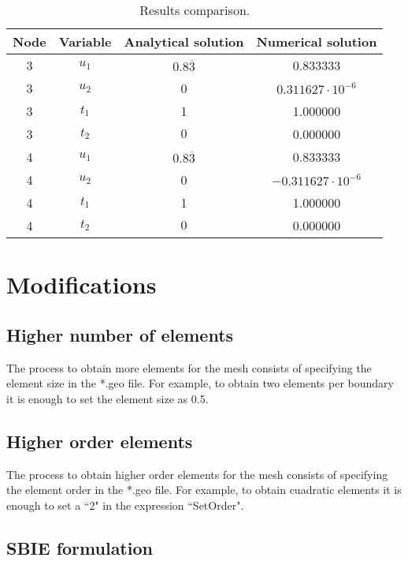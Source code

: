\documentclass[A4]{article}
\begin{document}
\begin{table}[h]
	\begin{center}
		\begin{tabular}{|*{4}{c}|}
			\hline
			Node & Variable & Analytical solution & Numerical solution \\
			\hline
			3 & $u_1$ & $0.8\overline{3}$ & 0.833333 \\
			\hline
			3 & $u_2$ & 0 & $0.311627\cdot 10^{-6}$ \\
			\hline
			3 & $t_1$ & 1 & 1.000000 \\
			\hline
			3 & $t_2$ & $0$ & 0.000000 \\
			\hline
			4 & $u_1$ & $0.8\overline{3}$ & 0.833333 \\
			\hline
			4 & $u_2$ & 0 & $-0.311627\cdot 10^{-6}$ \\
			\hline
			4 & $t_1$ & 1 & 1.000000 \\
			\hline
			4 & $t_2$ & $0$ & 0.000000 \\
			\hline
		\end{tabular}
	\end{center}
	\caption{Results comparison.}
	\label{tab:square_results}
\end{table}

\section{Modifications}

\subsection{Higher number of elements}

The process to obtain more elements for the mesh consists of specifying the element size in the *.geo file. For example, to obtain two elements per boundary it is enough to set the element size as 0.5.  

\subsection{Higher order elements}

The process to obtain higher order elements for the mesh consists of specifying the element order in the *.geo file. For example, to obtain cuadratic elements it is enough to set a ``2" in the expression ``SetOrder". 

\subsection{SBIE formulation}
\end{document}
